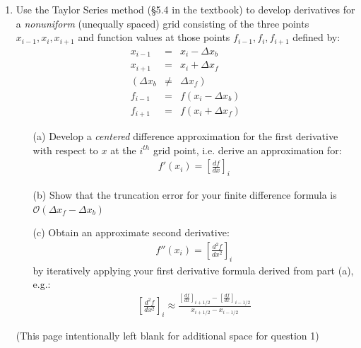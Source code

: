 \documentclass{article}
\begin{document}
\begin{enumerate}
  \item Use the Taylor Series method (\S 5.4 in the textbook) to develop derivatives for a \emph{nonuniform} (unequally spaced) grid consisting of the three points $x_{i-1},x_i,x_{i+1}$ and function values at those points $f_{i-1},f_i,f_{i+1}$ defined by:
    \begin{eqnarray}
      x_{i-1} &=& x_i - \Delta x_b \\
      x_{i+1} &=& x_i + \Delta x_f \\
      \left( \Delta x_b \right. &\ne& \left. \Delta x_f \right) \\
      f_{i-1} &=& f(x_i - \Delta x_b) \\ 
      f_{i+1} &=& f(x_i + \Delta x_f)     
    \end{eqnarray}
    \begin{itemize}
      \item[(a)]  Develop a \emph{centered} difference approximation for the first derivative with respect to $x$ at the $i^{th}$ grid point, i.e. derive an approximation for:
      \begin{eqnarray}
      f'(x_i) = \left[ \frac{d f}{d x} \right]_i
      \end{eqnarray}    
    \item[(b)]  Show that the truncation error for your finite difference formula is $\mathcal{O}(\Delta x_f - \Delta x_b)$
    \item[(c)]  Obtain an approximate second derivative:
      \begin{eqnarray}
        f''(x_i) = \left[ \frac{d^2 f}{d x^2} \right]_i
      \end{eqnarray}        
      by iteratively applying your first derivative formula derived from part (a), e.g.:
      \begin{eqnarray}
        \left[ \frac{d^2 f}{d x^2} \right]_i \approx 
        \frac{
        \left[ \frac{d f}{d x} \right]_{i+1/2} - \left[ \frac{d f}{d x} \right]_{i-1/2}
        }{x_{i+1/2}-x_{i-1/2}}
      \end{eqnarray} 
    \end{itemize}
    
    \pagebreak
    
    (This page intentionally left blank for additional space for question 1)
    ~\\
    
    \pagebreak
    

\end{enumerate}
\end{document}
